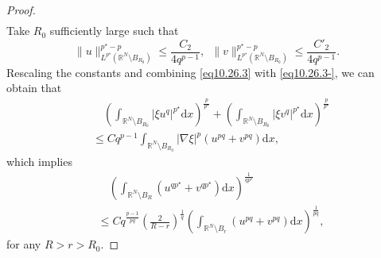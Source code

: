 \documentclass[12pt]{amsart}
\theoremstyle{definition}
\theoremstyle{remark}
\theoremstyle{conclusion}
\theoremstyle{conjecture}
\numberwithin{equation}{section}
\newcommand{\R}{\mathbb{R}}
\begin{document}
\begin{proof}
\begin{align}
\end{align}
Take $R_0$ sufficiently large such that
$$\|u\|_{L^{p^{\star}}(\R^N \setminus B_{R_0})}^{p^{\star}-p}\leq \frac{C_2}{4q^{p-1}}, \,\,\,\|v\|_{L^{p^{\star}}(\R^N \setminus B_{R_0})}^{p^{\star}-p} \leq \frac{C'_2}{4q^{p-1}}.$$
Rescaling the constants and combining \eqref{eq10.26.3} with \eqref{eq10.26.3-}, we can obtain that
\begin{align}\label{eq10.26.4}
&\quad \left(\int_{\R^N \setminus B_{R_0}} |\xi u^q|^{p^{\star}} \mathrm{d}x \right)^\frac{p}{p^{\star}} +\left(\int_{\R^N \setminus B_{R_0}} |\xi v^q|^{p^{\star}} \mathrm{d}x \right)^\frac{p}{p^{\star}}\\
&\leq C q^{p-1} \int_{\R^N \setminus B_{R_0}} |\nabla \xi|^p (u^{pq}+ v^{pq})\mathrm{d}x,\nonumber
\end{align}
which implies
\begin{align}\label{eq10.26.8}
&\quad \left(\int_{\R^N \setminus B_{R}} \left(u^{qp^{\star}}+v^{qp^{\star}}\right) \mathrm{d}x \right)^\frac{1}{q p^{\star}}\\
&\leq C q^\frac{p-1}{pq} \left(\frac{2}{R-r}\right)^\frac{1}{q} \left(\int_{\R^N \setminus B_{r}} (u^{pq}+v^{pq}) \mathrm{d}x\right)^\frac{1}{pq},\nonumber
\end{align}
for any $R>r>R_0$.


\end{proof}
\end{document}
